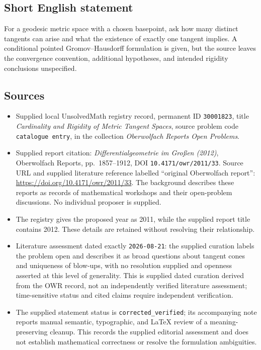 \documentclass[11pt]{article}
\begin{document}
\subsection{Short English statement}
For a geodesic metric space with a chosen basepoint, ask how many distinct tangents can arise and what the existence of exactly one tangent implies. A conditional pointed Gromov--Hausdorff formulation is given, but the source leaves the convergence convention, additional hypotheses, and intended rigidity conclusions unspecified.
\subsection{Sources}
\begin{itemize}
\item Supplied local UnsolvedMath registry record, permanent ID \texttt{30001823}, title \emph{Cardinality and Rigidity of Metric Tangent Spaces}, source problem code \texttt{catalogue entry}, in the collection \emph{Oberwolfach Reports Open Problems}.
\item Supplied report citation: \emph{Differentialgeometrie im Großen (2012)}, Oberwolfach Reports, pp.~1857--1912, DOI \texttt{10.4171/owr/2011/33}. Source URL and supplied literature reference labelled ``original Oberwolfach report'': \url{https://doi.org/10.4171/owr/2011/33}. The background describes these reports as records of mathematical workshops and their open-problem discussions. No individual proposer is supplied.
\item The registry gives the proposed year as 2011, while the supplied report title contains 2012. These details are retained without resolving their relationship.
\item Literature assessment dated exactly \texttt{2026-08-21}: the supplied curation labels the problem open and describes it as broad questions about tangent cones and uniqueness of blow-ups, with no resolution supplied and openness asserted at this level of generality. This is supplied dated curation derived from the OWR record, not an independently verified literature assessment; time-sensitive status and cited claims require independent verification.
\item The supplied statement status is \texttt{corrected\_verified}; its accompanying note reports manual semantic, typographic, and LaTeX review of a meaning-preserving cleanup. This records the supplied editorial assessment and does not establish mathematical correctness or resolve the formulation ambiguities.
\end{itemize}
\end{document}
